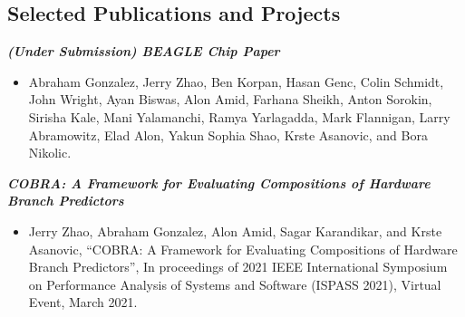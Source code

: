 \documentclass[letter]{res}
\begin{document}
\begin{resume}
\vspace{-2mm}





\section{Selected Publications and Projects}

{\sl \textbf{(Under Submission) BEAGLE Chip Paper}}\\

 \vspace{-4mm}

\begin{itemize}
 \item Abraham Gonzalez, Jerry Zhao, Ben Korpan, Hasan Genc, Colin Schmidt, John Wright, Ayan Biswas, Alon Amid, Farhana Sheikh, Anton Sorokin, Sirisha Kale, Mani Yalamanchi, Ramya Yarlagadda, Mark Flannigan, Larry Abramowitz, Elad Alon, Yakun Sophia Shao, Krste Asanovic, and Bora Nikolic.
\end{itemize}

\vspace{-2mm}

{\sl \textbf{COBRA: A Framework for Evaluating Compositions of Hardware Branch Predictors}}\\

 \vspace{-4mm}

\begin{itemize}
 \item Jerry Zhao, Abraham Gonzalez, Alon Amid, Sagar Karandikar, and Krste Asanovic, ``COBRA: A Framework for Evaluating Compositions of Hardware Branch Predictors'', In proceedings of 2021 IEEE International Symposium on Performance Analysis of Systems and Software (ISPASS 2021), Virtual Event, March 2021.
\end{itemize}


\end{resume}
\end{document}
